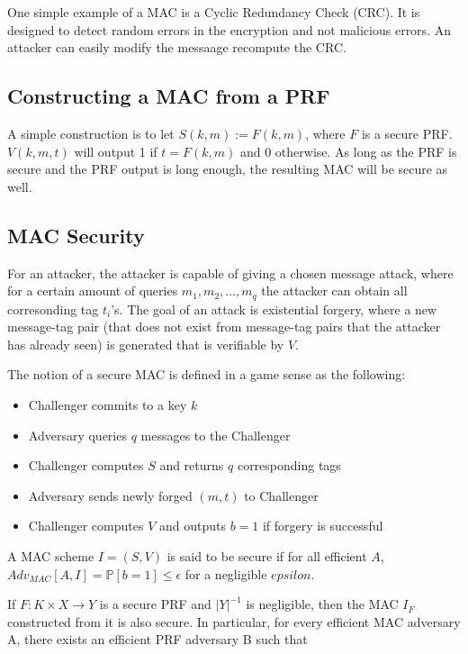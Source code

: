 \documentclass{article}
\begin{document}
\begin{multicols}{2}
One simple example of a MAC is a Cyclic Redundancy Check (CRC). It is designed to detect random errors in the encryption and not malicious errors. An attacker can easily modify the messaage recompute the CRC.

\subsection{Constructing a MAC from a PRF}

A simple construction is to let $S(k,m) := F(k,m)$, where $F$ is a secure PRF. $V(k,m,t)$ will output 1 if $t = F(k,m)$ and 0 otherwise. As long as the PRF is secure and the PRF output is long enough, the resulting MAC will be secure as well.

\subsection{MAC Security}

For an attacker, the attacker is capable of giving a chosen message attack, where for a certain amount of queries $m_1, m_2, ..., m_q$ the attacker can obtain all corresonding tag $t_i$'s. The goal of an attack is existential forgery, where a new message-tag pair (that does not exist from message-tag pairs that the attacker has already seen) is generated that is verifiable by $V$.

The notion of a secure MAC is defined in a game sense as the following:

\begin{itemize}
    \item Challenger commits to a key $k$
    \item Adversary queries $q$ messages to the Challenger
    \item Challenger computes $S$ and returns $q$ corresponding tags
    \item Adversary sends newly forged $(m,t)$ to Challenger
    \item Challenger computes $V$ and outputs $b=1$ if forgery is successful
\end{itemize}

A MAC scheme $I = (S,V)$ is said to be secure if for all efficient $A$, $Adv_{MAC}[A,I] = \mathbb{P}[b = 1] \leq \epsilon$ for a negligible $epsilon$.

If $F: K \times X \rightarrow Y$ is a secure PRF and $|Y|^{-1}$ is negligible, then the MAC $I_F$ constructed from it is also secure. In particular, for every efficient MAC adversary A, there exists an efficient PRF adversary B such that


\end{multicols}
\end{document}
